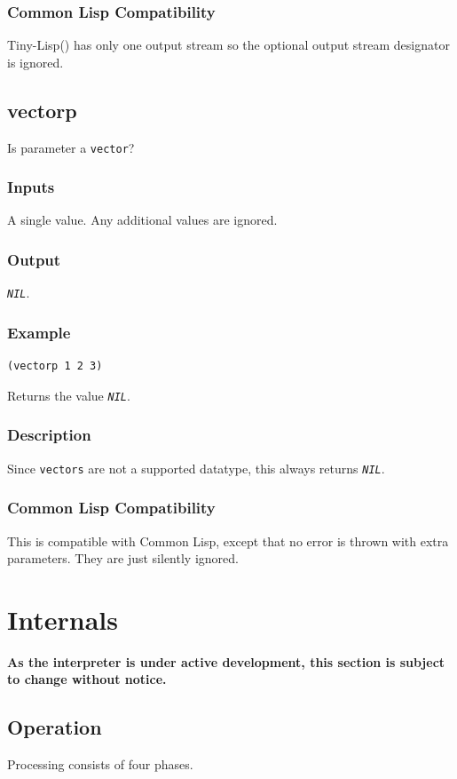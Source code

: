 \documentclass[10pt, openany]{book}
\newcommand{\constant}[1]{\emph{\texttt{#1}}}
\newcommand{\datatype}[1]{\texttt{#1}}
\newcommand{\tl}{Tiny-Lisp}
\newcommand{\cl}{Common Lisp}
\begin{document}
\subsection{Common Lisp Compatibility}
\tl() has only one output stream so the optional output stream designator is ignored.

\section{vectorp}
Is parameter a \datatype{vector}?
\subsection{Inputs}
A single value.  Any additional values are ignored.
\subsection{Output}
\constant{NIL}.
\subsection{Example}
\begin{lstlisting}
(vectorp 1 2 3)
\end{lstlisting}
Returns the value \constant{NIL}.
\subsection{Description}
Since \datatype{vectors} are not a supported datatype, this always returns \constant{NIL}.
\subsection{Common Lisp Compatibility}
This is compatible with \cl, except that no error is thrown with extra parameters.  They are just silently ignored.

\chapter{Internals}
\textbf{As the interpreter is under active development, this section is subject to change without notice.}

\section{Operation}
Processing consists of four phases.
\end{document}
